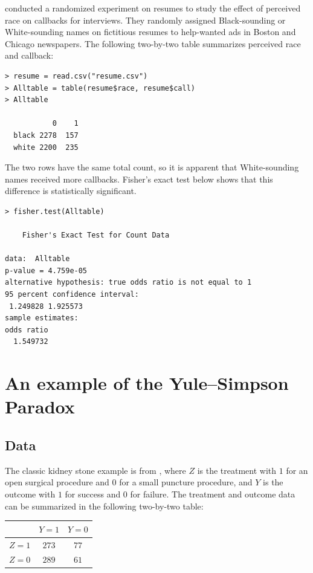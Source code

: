  
 \begin{example}\label{eg::bertrand2004emily-chapter1}
 \citet{bertrand2004emily} conducted a randomized experiment on resumes to study the effect of perceived race on callbacks for interviews. They randomly assigned Black-sounding or White-sounding names on fictitious resumes to help-wanted ads in Boston and Chicago newspapers. The following two-by-two table summarizes perceived race and callback:
 
 \begin{lstlisting} 
> resume = read.csv("resume.csv")
> Alltable = table(resume$race, resume$call)
> Alltable
       
           0    1
  black 2278  157
  white 2200  235
    \end{lstlisting} 


The two rows have the same total count, so it is apparent that White-sounding names received more callbacks. Fisher's exact test below shows that this difference is statistically significant.    
     \begin{lstlisting} 
> fisher.test(Alltable)

	Fisher's Exact Test for Count Data

data:  Alltable
p-value = 4.759e-05
alternative hypothesis: true odds ratio is not equal to 1
95 percent confidence interval:
 1.249828 1.925573
sample estimates:
odds ratio 
  1.549732 
  \end{lstlisting} 
 
 \end{example}
 
\section{An example of the Yule--Simpson Paradox} 

\subsection{Data}
The classic kidney stone example is from \citet{charig1986comparison}, where $Z$ is the treatment with $1$ for an open surgical procedure and $0$ for a small puncture procedure, and $Y$ is the outcome with $1$ for success and $0$ for failure. The treatment and outcome data can be summarized in the following two-by-two table: 

 \begin{center}
\begin{tabular}{lcc}
\hline 
        & $Y =1$ & $Y =0$\\\hline
$Z =1$ & $273$ & $77$\\ 
$Z =0$ & $289$ & $61$\\ 
\hline 
\end{tabular}
\end{center}



